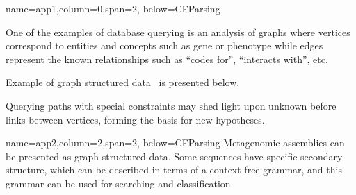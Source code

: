 \documentclass[a0paper,portrait]{baposter}
\begin{document}
\begin{poster}
{


}

{name=app1,column=0,span=2, below=CFParsing}
{ %
One of the examples of database querying is an analysis of graphs where vertices correspond to entities and concepts such as gene or phenotype while edges represent the known relationships such as ``codes for'', ``interacts with'', etc.

Example of graph structured data~\cite{Earley} is presented below.

Querying paths with special constraints may shed light upon unknown before links between vertices, forming the basis for new hypotheses.
}


{name=app2,column=2,span=2, below=CFParsing}
{
Metagenomic assemblies can be presented as graph structured data.
Some sequences have specific secondary structure, which can be described in terms of a context-free grammar, and this grammar can be used for searching and classification.
}



\end{poster}
\end{document}
